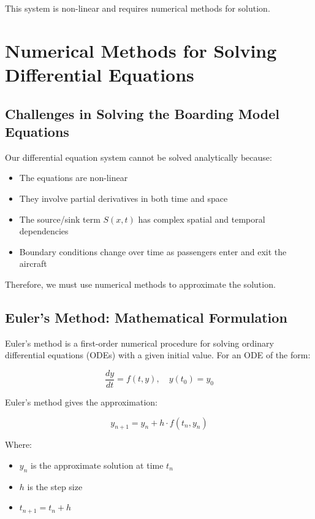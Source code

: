 \documentclass[a4paper,12pt]{article}
\begin{document}
This system is non-linear and requires numerical methods for solution.

\section{Numerical Methods for Solving Differential Equations}

\subsection{Challenges in Solving the Boarding Model Equations}

Our differential equation system cannot be solved analytically because:
\begin{itemize}
    \item The equations are non-linear
    \item They involve partial derivatives in both time and space
    \item The source/sink term $S(x,t)$ has complex spatial and temporal dependencies
    \item Boundary conditions change over time as passengers enter and exit the aircraft
\end{itemize}

Therefore, we must use numerical methods to approximate the solution.

\subsection{Euler's Method: Mathematical Formulation}

Euler's method is a first-order numerical procedure for solving ordinary differential equations (ODEs) with a given initial value. For an ODE of the form:

\begin{equation}
\frac{dy}{dt} = f(t, y), \quad y(t_0) = y_0
\end{equation}

Euler's method gives the approximation:

\begin{equation}
y_{n+1} = y_n + h \cdot f(t_n, y_n)
\end{equation}

Where:
\begin{itemize}
    \item $y_n$ is the approximate solution at time $t_n$
    \item $h$ is the step size
    \item $t_{n+1} = t_n + h$
\end{itemize}
\end{document}
